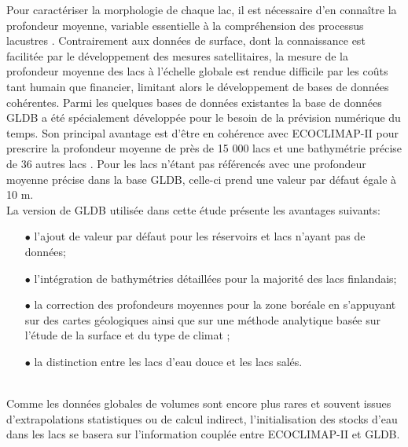 Pour caractériser la morphologie de chaque lac, il est nécessaire d'en connaître la profondeur moyenne, variable essentielle à la compréhension des processus lacustres \citep{hakanson2005}. Contrairement aux données de surface, dont la connaissance est facilitée par le développement des mesures satellitaires, la mesure de la profondeur moyenne des lacs à l'échelle globale est rendue difficile par les coûts tant humain que financier, limitant alors le développement de bases de données cohérentes. 
Parmi les quelques bases de données existantes \citep{lehner2004,verpoorter2014,messager2016} la base de données GLDB \citep{kourzeneva2012} a été spécialement développée pour le besoin de la prévision numérique du temps. Son principal avantage est d'être en cohérence avec ECOCLIMAP-II pour prescrire la profondeur moyenne de près de 15 000 lacs et une bathymétrie précise de 36 autres lacs \citep{toptunova2019,choulga2019}. Pour les lacs n'étant pas référencés avec une profondeur moyenne précise dans la base GLDB, celle-ci prend une valeur par défaut égale à 10 m.\\

\noindent La version de GLDB utilisée dans cette étude présente les avantages suivants:\\

\begin{itemize}
\item[$\bullet$] l'ajout de valeur par défaut pour les réservoirs et lacs n'ayant pas de données;
\item[$\bullet$] l'intégration de bathymétries détaillées pour la majorité des lacs finlandais;
\item[$\bullet$] la correction des profondeurs moyennes pour la zone boréale en s'appuyant sur des cartes géologiques ainsi que sur une méthode analytique basée sur l'étude de la surface et du type de climat \citep{choulga2014};
\item[$\bullet$] la distinction entre les lacs d'eau douce et les lacs salés.
\end{itemize}
~\\
Comme les données globales de volumes sont encore plus rares et souvent issues d'extrapolations statistiques ou de calcul indirect, l'initialisation des stocks d'eau dans les lacs se basera sur l'information couplée entre ECOCLIMAP-II et GLDB. 

